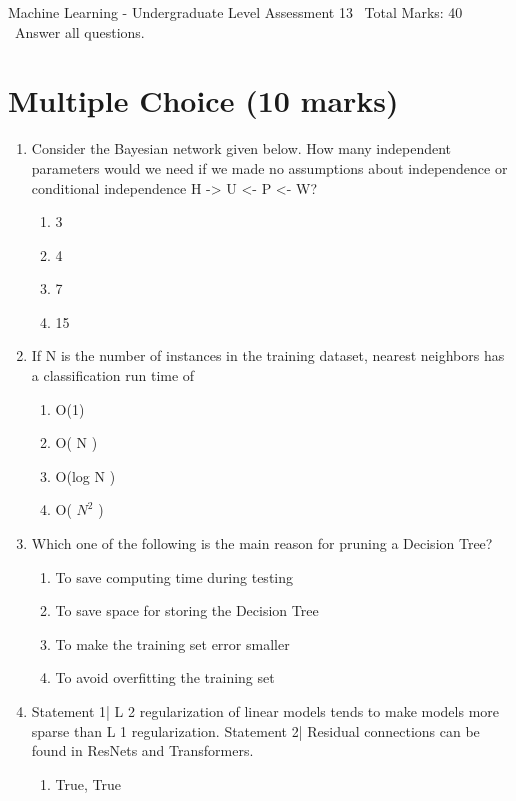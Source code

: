 \documentclass[12pt]{article}
\begin{document}
\begin{center}
Machine Learning - Undergraduate Level Assessment 13 \
Total Marks: 40 \
Answer all questions.
\end{center}

\section*{Multiple Choice (10 marks)}
\begin{enumerate}[label=\arabic*.]
\item Consider the Bayesian network given below. How many independent parameters would we need if we made no assumptions about independence or conditional independence H -\textgreater{} U \textless{}- P \textless{}- W?
\begin{enumerate}[label=(\alph*)]
    \item 3
    \item 4
    \item 7
    \item 15
\end{enumerate}
\item If N is the number of instances in the training dataset, nearest neighbors has a classification run time of
\begin{enumerate}[label=(\alph*)]
    \item O(1)
    \item O( N )
    \item O(log N )
    \item O( $N^2$ )
\end{enumerate}
\item Which one of the following is the main reason for pruning a Decision Tree?
\begin{enumerate}[label=(\alph*)]
    \item To save computing time during testing
    \item To save space for storing the Decision Tree
    \item To make the training set error smaller
    \item To avoid overfitting the training set
\end{enumerate}
\item Statement 1| L 2 regularization of linear models tends to make models more sparse than L 1 regularization. Statement 2| Residual connections can be found in ResNets and Transformers.
\begin{enumerate}[label=(\alph*)]
    \item True, True

\end{enumerate}
\end{enumerate}
\end{document}
